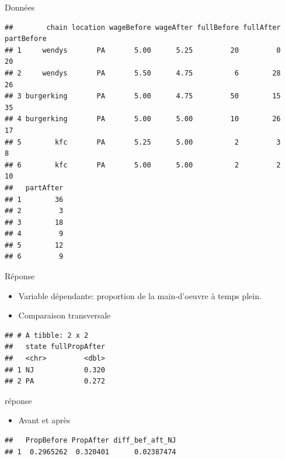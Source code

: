 \documentclass[ignorenonframetext,]{beamer}
\providecommand{\tightlist}{%
  \setlength{\itemsep}{0pt}\setlength{\parskip}{0pt}}
\begin{document}
\begin{frame}[fragile]{Données}
\protect\hypertarget{donnees-1}{}

\begin{verbatim}
##        chain location wageBefore wageAfter fullBefore fullAfter partBefore
## 1     wendys       PA       5.00      5.25         20         0         20
## 2     wendys       PA       5.50      4.75          6        28         26
## 3 burgerking       PA       5.00      4.75         50        15         35
## 4 burgerking       PA       5.00      5.00         10        26         17
## 5        kfc       PA       5.25      5.00          2         3          8
## 6        kfc       PA       5.00      5.00          2         2         10
##   partAfter
## 1        36
## 2         3
## 3        18
## 4         9
## 5        12
## 6         9
\end{verbatim}

\end{frame}

\begin{frame}[fragile]{Réponse}
\protect\hypertarget{reponse}{}

\begin{itemize}
\tightlist
\item
  Variable dépendante: proportion de la main-d'oeuvre à temps plein.
\item
  Comparaison transversale
\end{itemize}

\begin{verbatim}
## # A tibble: 2 x 2
##   state fullPropAfter
##   <chr>         <dbl>
## 1 NJ            0.320
## 2 PA            0.272
\end{verbatim}

\end{frame}

\begin{frame}[fragile]{réponse}
\protect\hypertarget{reponse-1}{}

\begin{itemize}
\tightlist
\item
  Avant et après
\end{itemize}

\begin{verbatim}
##   PropBefore PropAfter diff_bef_aft_NJ
## 1  0.2965262  0.320401      0.02387474
\end{verbatim}

\end{frame}
\end{document}
